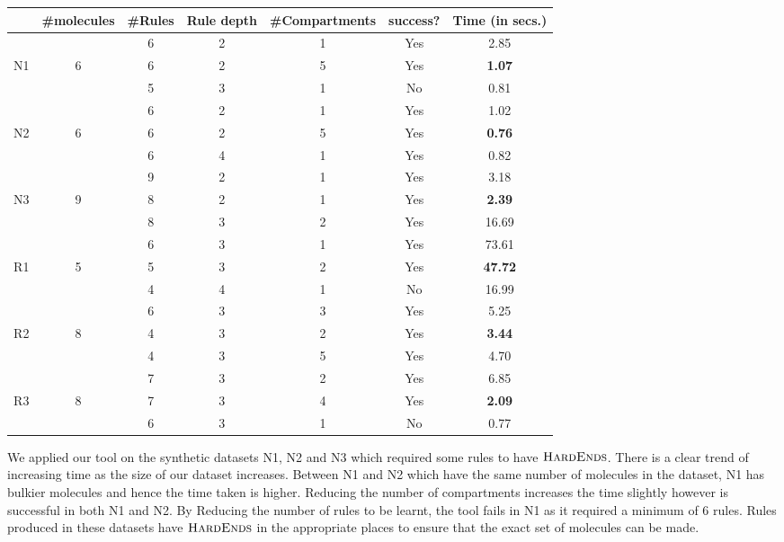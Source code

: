 \begin{table}
  \centering
  \begin{tabular}{|c|c|c|c|c|c|c|}\hline
     & \#molecules& \#Rules & Rule depth & \#Compartments & success? & Time (in secs.) 
          \\\hline
         &   & 6  & 2 & 1 & Yes &  2.85 \\\cline{3-7}
    N1   & 6 & 6  & 2 & 5 & Yes & {\bf 1.07}  \\\cline{3-7}
         &   & 5  & 3 & 1 & No & 0.81  \\\hline
         
         &   & 6  & 2 & 1 & Yes & 1.02  \\\cline{3-7}
    N2   & 6 & 6  & 2 & 5 & Yes & {\bf 0.76}  \\\cline{3-7}
         &   & 6  & 4 & 1 & Yes & 0.82 \\\hline
         
         &   & 9  & 2  & 1  & Yes & 3.18  \\\cline{3-7}
    N3   & 9 & 8  & 2 & 1 & Yes & {\bf 2.39}  \\\cline{3-7}
         &   & 8  & 3 & 2 & Yes  &  16.69 \\\hline
         
         &   & 6  & 3  & 1  & Yes & 73.61  \\\cline{3-7}
    R1   & 5 & 5  & 3 & 2 & Yes & {\bf 47.72}  \\\cline{3-7}
         &   & 4  & 4 & 1 & No  &  16.99 \\\hline
         
         &   & 6  & 3 & 3 & Yes &  5.25 \\\cline{3-7}
    R2   & 8 & 4  & 3 & 2 & Yes & {\bf 3.44}  \\\cline{3-7}
         &   & 4  & 3 & 5 & Yes  &  4.70 \\\hline
         
         &   & 7  & 3 & 2 & Yes &  6.85 \\\cline{3-7}
    R3   & 8 & 7  & 3 & 4 & Yes & {\bf 2.09}  \\\cline{3-7}
         &   & 6  & 3 & 1 & No  & 0.77  \\\hline
  \end{tabular}   
  \end{table}
 We applied our tool on the synthetic datasets N1, N2 and N3 which required some rules to have $\textsc{HardEnds}$. There is a clear trend of increasing time as the size of our dataset increases. Between N1 and N2 which have the same number of molecules in the dataset, N1 has bulkier molecules and hence the time taken is higher. Reducing the number of compartments increases the time slightly however is successful in both N1 and N2. By Reducing the number of rules to be learnt, the tool fails in N1 as it required a minimum of 6 rules. Rules produced in these datasets have $\textsc{HardEnds}$ in the appropriate places to ensure that the exact set of molecules can be made.

